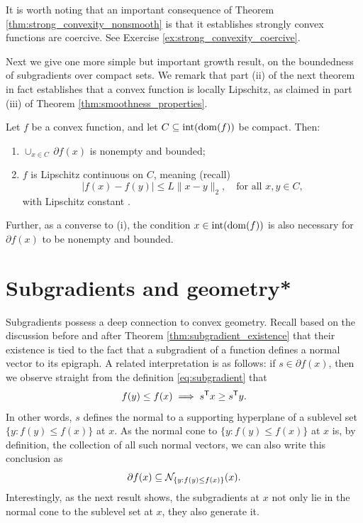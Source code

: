 It is worth noting that an important consequence of Theorem
\ref{thm:strong_convexity_nonsmooth} is that it establishes strongly convex
functions are coercive. See Exercise \ref{ex:strong_convexity_coercive}.

Next we give one more simple but important growth result, on the boundedness of
subgradients over compact sets. We remark that part (ii) of the next theorem in
fact establishes that a convex function is locally Lipschitz, as claimed in part
(iii) of Theorem \ref{thm:smoothness_properties}.  

\begin{Theorem}
\label{thm:subgradient_boundedness}
Let $f$ be a convex function, and let $C \subseteq \operatorname{int}(\operatorname{dom}(f))$ be 
compact. Then:
\begin{enumerate}[label=(\roman*)]
\item $\cup_{x \in C} \, \partial f(x)$ is nonempty and bounded;  
\item $f$ is Lipschitz continuous on $C$, meaning (recall)
  \[
  |f(x) - f(y)| \leq L \|x-y\|_2, \quad \text{for all $x,y \in C$},
  \]
  with Lipschitz constant . 
\end{enumerate}
Further, as a converse to (i), the condition $x \in \operatorname{int}(\operatorname{dom}(f))$ is also 
necessary for $\partial f(x)$ to be nonempty and bounded.   
\end{Theorem}



\section{Subgradients and geometry*}

Subgradients possess a deep connection to convex geometry. Recall based on the
discussion before and after Theorem \ref{thm:subgradient_existence} that their
existence is tied to the fact that a subgradient of a function defines a normal
vector to its epigraph. A related interpretation is as follows: if $s \in
\partial f(x)$, then we observe straight from the definition
\eqref{eq:subgradient} that
\[
f(y) \leq f(x) \implies s^{\mathsf{T}} x \geq s^{\mathsf{T}} y.
\]
In other words, $s$ defines the normal to a supporting hyperplane of a sublevel
set $\{y : f(y) \leq f(x)\}$ at $x$. As the normal cone to $\{y : f(y) \leq
f(x)\}$ at $x$ is, by definition, the collection of all such normal vectors, we
can also write this conclusion as   
\[
\partial f(x) \subseteq \mathcal{N}_{\{y : f(y) \leq f(x)\}}(x).
\]
Interestingly, as the next result shows, the subgradients at $x$ not only lie in
the normal cone to the sublevel set at $x$, they also generate it. 

